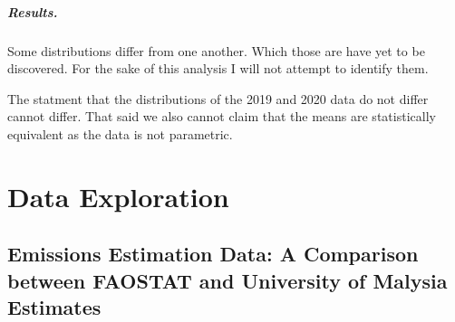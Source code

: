 \documentclass[letterpaper,10pt,english]{jupyterBook}
\begin{document}
\subsubsection{Results.}
\label{\detokenize{notebooks/testing_malaysian_paper:id4}}
\sphinxAtStartPar
Some distributions differ from one another.  Which those are have yet to be discovered.  For the sake of this analysis I will not attempt to identify them.

\sphinxAtStartPar
The statment that the distributions of the 2019 and 2020 data do not differ cannot differ.  That said we also cannot claim that the means are statistically equivalent as the data is not parametric.

\sphinxstepscope


\part{Data Exploration}

\sphinxstepscope


\chapter{Emissions Estimation Data: A Comparison between FAOSTAT and University of Malysia Estimates}
\label{\detokenize{notebooks/data_exploration:emissions-estimation-data-a-comparison-between-faostat-and-university-of-malysia-estimates}}\label{\detokenize{notebooks/data_exploration:data-exploration-title}}\label{\detokenize{notebooks/data_exploration::doc}}
\end{document}
